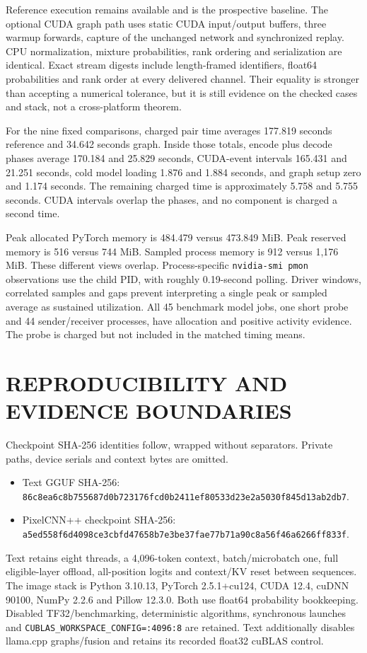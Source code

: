 \documentclass[a4paper,twoside]{article}
\begin{document}
Reference execution remains available and is the prospective baseline. The optional CUDA graph path uses static CUDA input/output buffers, three warmup forwards, capture of the unchanged network and synchronized replay. CPU normalization, mixture probabilities, rank ordering and serialization are identical. Exact stream digests include length-framed identifiers, float64 probabilities and rank order at every delivered channel. Their equality is stronger than accepting a numerical tolerance, but it is still evidence on the checked cases and stack, not a cross-platform theorem.

For the nine fixed comparisons, charged pair time averages 177.819 seconds reference and 34.642 seconds graph. Inside those totals, encode plus decode phases average 170.184 and 25.829 seconds, CUDA-event intervals 165.431 and 21.251 seconds, cold model loading 1.876 and 1.884 seconds, and graph setup zero and 1.174 seconds. The remaining charged time is approximately 5.758 and 5.755 seconds. CUDA intervals overlap the phases, and no component is charged a second time.

Peak allocated PyTorch memory is 484.479 versus 473.849 MiB. Peak reserved memory is 516 versus 744 MiB. Sampled process memory is 912 versus 1,176 MiB. These different views overlap. Process-specific \texttt{nvidia-smi pmon} observations use the child PID, with roughly 0.19-second polling. Driver windows, correlated samples and gaps prevent interpreting a single peak or sampled average as sustained utilization. All 45 benchmark model jobs, one short probe and 44 sender/receiver processes, have allocation and positive activity evidence. The probe is charged but not included in the matched timing means.


\section{\uppercase{Reproducibility and Evidence Boundaries}}
Checkpoint SHA-256 identities follow, wrapped without separators. Private paths, device serials and context bytes are omitted.
\begin{itemize}
\item Text GGUF SHA-256: \texttt{86c8ea6c8b755687d0b723176fcd0b24}\allowbreak\texttt{11ef80533d23e2a5030f845d13ab2db7}.
\item PixelCNN++ checkpoint SHA-256: \texttt{a5ed558f6d4098ce3cbfd47658b7e3be}\allowbreak\texttt{37fae77b71a90c8a56f46a6266ff833f}.
\end{itemize}
Text retains eight threads, a 4,096-token context, batch/microbatch one, full eligible-layer offload, all-position logits and context/KV reset between sequences. The image stack is Python 3.10.13, PyTorch 2.5.1+cu124, CUDA 12.4, cuDNN 90100, NumPy 2.2.6 and Pillow 12.3.0. Both use float64 probability bookkeeping. Disabled TF32/benchmarking, deterministic algorithms, synchronous launches and \texttt{CUBLAS\_WORKSPACE\_CONFIG=:4096:8} are retained. Text additionally disables llama.cpp graphs/fusion and retains its recorded float32 cuBLAS control.
\end{document}
